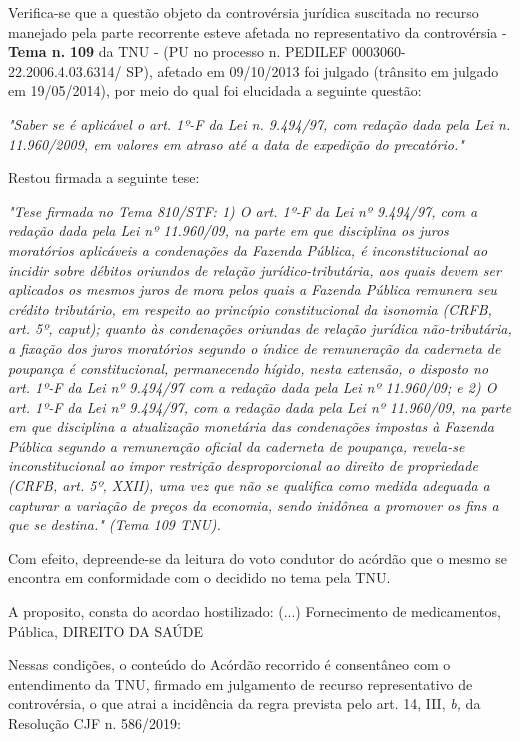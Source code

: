 \documentclass[12pt]{article}
\begin{document}
\justifying
\noindent Verifica-se que a questão objeto da controvérsia jurídica suscitada no recurso manejado pela parte recorrente esteve afetada no representativo da controvérsia - \textbf{Tema n. }\textbf{109} da TNU - (PU no processo n. PEDILEF 0003060-22.2006.4.03.6314/ SP),  afetado em 09/10/2013 foi julgado (trânsito em julgado em 19/05/2014), por meio do qual foi elucidada a seguinte questão:

\noindent \textit{"Saber se é aplicável o art. 1º-F da Lei n. 9.494/97, com redação dada pela Lei n. 11.960/2009, em valores em atraso até a data de expedição do precatório."}

\noindent Restou firmada a seguinte tese:

\noindent \textit{"Tese firmada no Tema 810/STF: 1) O art. 1º-F da Lei nº 9.494/97, com a redação dada pela Lei nº 11.960/09, na parte em que disciplina os juros moratórios aplicáveis a condenações da Fazenda Pública, é inconstitucional ao incidir sobre débitos oriundos de relação jurídico-tributária, aos quais devem ser aplicados os mesmos juros de mora pelos quais a Fazenda Pública remunera seu crédito tributário, em respeito ao princípio constitucional da isonomia (CRFB, art. 5º, caput); quanto às condenações oriundas de relação jurídica não-tributária, a fixação dos juros moratórios segundo o índice de remuneração da caderneta de poupança é constitucional, permanecendo hígido, nesta extensão, o disposto no art. 1º-F da Lei nº 9.494/97 com a redação dada pela Lei nº 11.960/09; e 2) O art. 1º-F da Lei nº 9.494/97, com a redação dada pela Lei nº 11.960/09, na parte em que disciplina a atualização monetária das condenações impostas à Fazenda Pública segundo a remuneração oficial da caderneta de poupança, revela-se inconstitucional ao impor restrição desproporcional ao direito de propriedade (CRFB, art. 5º, XXII), uma vez que não se qualifica como medida adequada a capturar a variação de preços da economia, sendo inidônea a promover os fins a que se destina." (Tema 109 TNU).}

\noindent Com efeito, depreende-se da leitura do voto condutor do acórdão que o mesmo se encontra em conformidade com o decidido no  tema pela TNU.

\noindent A proposito, consta do acordao hostilizado: (...) Fornecimento de medicamentos, Pública, DIREITO DA SAÚDE

\noindent Nessas condições, o conteúdo do Acórdão recorrido é consentâneo com o entendimento da TNU, firmado em julgamento de recurso representativo de controvérsia, o que atrai a incidência da regra prevista pelo art. 14, III, \textit{b,} da Resolução CJF n. 586/2019:
\end{document}
